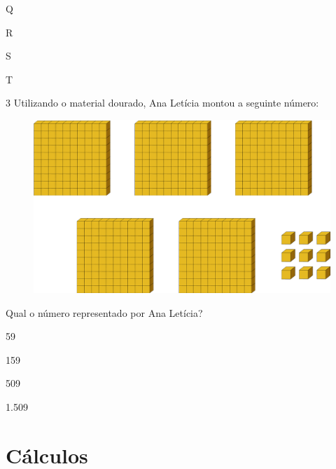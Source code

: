 \begin{escolha}
\item
  Q
\item
  R
\item
  S
\item
  T
\end{escolha}

\pagebreak
\num{3} Utilizando o material dourado, Ana Letícia montou a seguinte número:

\begin{figure}[htpb!]
\centering
\includegraphics[width=\textwidth]{./media/image9.png}
\end{figure}

Qual o número representado por Ana Letícia?

\begin{escolha}
\item
  59
\item
  159
\item
  509
\item
  1.509
\end{escolha}


\chapter{Cálculos}


